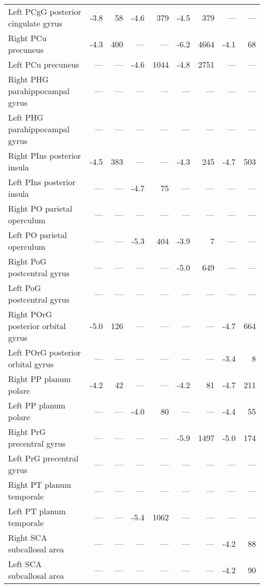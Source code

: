 \documentclass[]{article}
\begin{document}
\begin{table}[ht]
{\begin{tabular}{lrrrrrrrr}
  Left PCgG  posterior cingulate gyrus & -3.8 & 58 & -4.6 & 379 & -4.5 & 379 & --- & --- \\ 
  Right PCu   precuneus & -4.3 & 400 & --- & --- & -6.2 & 4664 & -4.1 & 68 \\ 
  Left PCu   precuneus & --- & --- & -4.6 & 1044 & -4.8 & 2751 & --- & --- \\ 
  Right PHG   parahippocampal gyrus & --- & --- & --- & --- & --- & --- & --- & --- \\ 
  Left PHG   parahippocampal gyrus & --- & --- & --- & --- & --- & --- & --- & --- \\ 
  Right PIns  posterior insula & -4.5 & 383 & --- & --- & -4.3 & 245 & -4.7 & 503 \\ 
  Left PIns  posterior insula & --- & --- & -4.7 & 75 & --- & --- & --- & --- \\ 
  Right PO    parietal operculum & --- & --- & --- & --- & --- & --- & --- & --- \\ 
  Left PO    parietal operculum & --- & --- & -5.3 & 404 & -3.9 & 7 & --- & --- \\ 
  Right PoG   postcentral gyrus & --- & --- & --- & --- & -5.0 & 649 & --- & --- \\ 
  Left PoG   postcentral gyrus & --- & --- & --- & --- & --- & --- & --- & --- \\ 
  Right POrG  posterior orbital gyrus & -5.0 & 126 & --- & --- & --- & --- & -4.7 & 664 \\ 
  Left POrG  posterior orbital gyrus & --- & --- & --- & --- & --- & --- & -3.4 & 8 \\ 
  Right PP    planum polare & -4.2 & 42 & --- & --- & -4.2 & 81 & -4.7 & 211 \\ 
  Left PP    planum polare & --- & --- & -4.0 & 80 & --- & --- & -4.4 & 55 \\ 
  Right PrG   precentral gyrus & --- & --- & --- & --- & -5.9 & 1497 & -5.0 & 174 \\ 
  Left PrG   precentral gyrus & --- & --- & --- & --- & --- & --- & --- & --- \\ 
  Right PT    planum temporale & --- & --- & --- & --- & --- & --- & --- & --- \\ 
  Left PT    planum temporale & --- & --- & -5.4 & 1062 & --- & --- & --- & --- \\ 
  Right SCA   subcallosal area & --- & --- & --- & --- & --- & --- & -4.2 & 88 \\ 
  Left SCA   subcallosal area & --- & --- & --- & --- & --- & --- & -4.2 & 90 \\ 

\end{tabular}}
\end{table}
\end{document}
